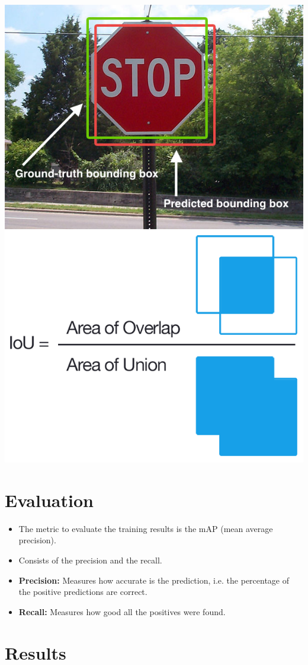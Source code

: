 \documentclass[a0, portrait]{a0poster}
\begin{document}
\begin{multicols}{3}
\begin{center}\vspace{1cm}
  \includegraphics[width=0.6\linewidth]{jaccard_overlap.png}
\end{center}


\section*{Evaluation}

\begin{itemize}
  \item The metric to evaluate the training results is the mAP (mean average precision).
  \item Consists of the precision and the recall.
  \item \textbf{Precision:} Measures how accurate is the prediction, i.e. the percentage of the positive predictions are correct.
  \item \textbf{Recall:} Measures how good all the positives were found.
\end{itemize}


\section*{Results}


\end{multicols}
\end{document}
